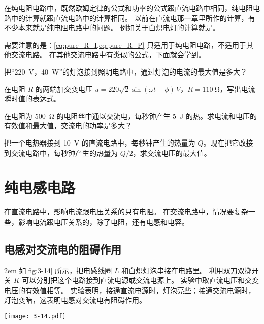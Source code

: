 \medskip
在纯电阻电路中，既然欧姆定律的公式和功率的公式跟直流电路中相同，纯电阻电路中的计算就跟直流电路中的计算相同。
以前在直流电那一章里所作的计算，有不少本来就是纯电阻电路中的问题。
例如关于白炽电灯的计算就是。

需要注意的是：\cref{eq:pure_R_I,eq:pure_R_P} 只适用于纯电阻电路，不适用于其他交流电路。
在其他交流电路中有类似的公式，下面就会学到。	

\begin{Practice}
\begin{question}
  \item 把“\qty{220}{V}，\qty{40}{W}”的灯泡接到照明电路中，通过灯泡的电流的最大值是多大？
  \item 在电阻 $R$ 的两端加交变电压 $u=220\sqrt{2}\sin(\omega t+\phi)\,\unit{V}$，$R=\qty{110}{\ohm}$，写出电流瞬时值的表达式。
  \item 在电阻为 \qty{500}{\ohm} 的电阻丝中通以交流电，每秒钟产生 \qty{5}{J} 的热。求电流和电压的有效值和最大值，交流电的功率是多大？
  \item 把一个电热器接到 \qty{10}{V} 的直流电路中，每秒钟产生的热量为 $Q$。现在把它改接到交流电路中，每秒钟产生的热量为 $Q/2$，求交流电压的最大值。
\end{question}
\end{Practice}

\section{纯电感电路}
在直流电路中，影响电流跟电压关系的只有电阻。
在交流电路中，情况要复杂一些，影响电流跟电压关系的，除了电阻，还有电感和电容。	
	
\subsection{电感对交流电的阻碍作用}

\medskip\noindent
\begin{minipage}{0.55\linewidth}\parindent2em
如\cref{fig:3-14} 所示，把电感线圈 $L$ 和白炽灯泡串接在电路里。
利用双刀双掷开关 $K$ 可以分别把这个电路接到直流电源或交流电源上。
实验中取直流电压和交变电压的有效值相等。
实验表明，接通直流电源时，灯泡亮些；接通交流电源时，灯泡变暗，这表明电感对交流电有阻碍作用。
\end{minipage}\hfill
\begin{minipage}{0.4\linewidth}\centering
  \begin{figurehere}
    \texttt{[image: 3-14.pdf]}
    \caption{}\label{fig:3-14}
  \end{figurehere}
\end{minipage}

